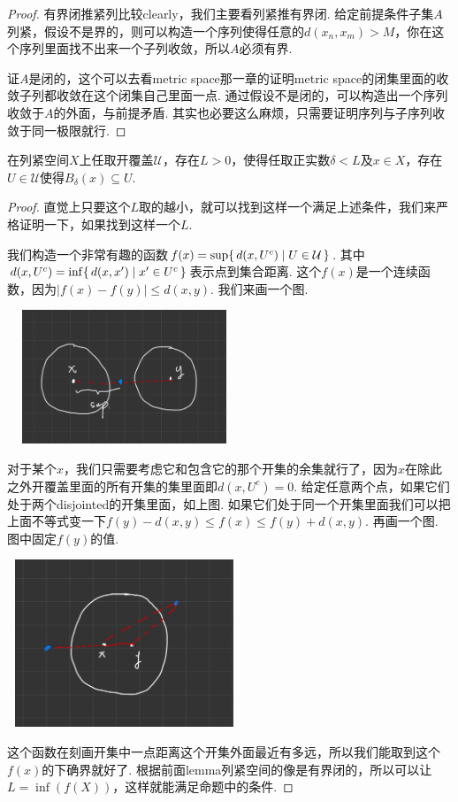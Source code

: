 \begin{proof}
有界闭推紧列比较clearly，我们主要看列紧推有界闭. 给定前提条件子集$A$列紧，假设不是界的，则可以构造一个序列使得任意的$d(x_n,x_m) > M$，你在这个序列里面找不出来一个子列收敛，所以$A$必须有界.

证$A$是闭的，这个可以去看metric space那一章的证明metric space的闭集里面的收敛子列都收敛在这个闭集自己里面一点. 通过假设不是闭的，可以构造出一个序列收敛于$A$的外面，与前提矛盾. 其实也必要这么麻烦，只需要证明序列与子序列收敛于同一极限就行.
\end{proof}


\begin{lemma}
在列紧空间$X$上任取开覆盖$\mathcal{U}$，存在$L > 0$，使得任取正实数$\delta < L$及$x \in X$，存在$U \in \mathcal{U}$使得$B_\delta(x) \subseteq U$.
\end{lemma}

\begin{proof}
直觉上只要这个$L$取的越小，就可以找到这样一个满足上述条件，我们来严格证明一下，如果找到这样一个$L$.

我们构造一个非常有趣的函数$f(x)=\sup\{\,d(x,U^{c})\mid U \in \mathcal{U}\,\}$. 其中$d(x,U^{c}) = \inf\{\,d(x,x')\mid x' \in U^{c}\,\}$表示点到集合距离. 这个$f(x)$是一个连续函数，因为$|f(x)-f(y)| \leq d(x,y)$. 我们来画一个图.
\begin{center}
\includegraphics[width=7cm, height=4cm]{images/sup_distance_of_point_between_set.jpg}
\end{center}
对于某个$x$，我们只需要考虑它和包含它的那个开集的余集就行了，因为$x$在除此之外开覆盖里面的所有开集的集里面即$d(x,U^{c})=0$. 给定任意两个点，如果它们处于两个disjointed的开集里面，如上图. 如果它们处于同一个开集里面我们可以把上面不等式变一下$f(y)-d(x,y) \leq f(x) \leq f(y)+d(x,y)$. 再画一个图. 图中固定$f(y)$的值. 

\begin{center}
\includegraphics[width=7cm, height=5cm]{images/sup_distance_of_point_between_set2.jpg}
\end{center}

这个函数在刻画开集中一点距离这个开集外面最近有多远，所以我们能取到这个$f(x)$的下确界就好了. 根据前面lemma列紧空间的像是有界闭的，所以可以让$L = \inf(f(X))$，这样就能满足命题中的条件.
\end{proof}


